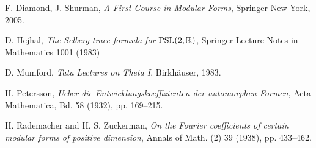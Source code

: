 \begin{thebibliography}{10}



 {\sc F. Diamond, J. Shurman}, \emph{A First Course in Modular Forms}, Springer New York, 2005.



 {\sc D. Hejhal}, {\em The Selberg trace formula for $\mathrm{PSL}(2, \mathbb{R})$},  Springer Lecture Notes in Mathematics 1001 (1983)


 {\sc D. Mumford}, {\em Tata Lectures on Theta I}, Birkh\"auser, 1983.



 {\sc H. Petersson}, {\em Ueber die Entwicklungskoeffizienten der automorphen Formen}, Acta Mathematica, Bd. 58 (1932),  pp. 169--215.


 {\sc H. Rademacher and H. S. Zuckerman}, {\em On the Fourier coefficients of certain modular forms of
positive dimension}, Annals of Math. (2) 39 (1938),  pp. 433--462.



\end{thebibliography}
